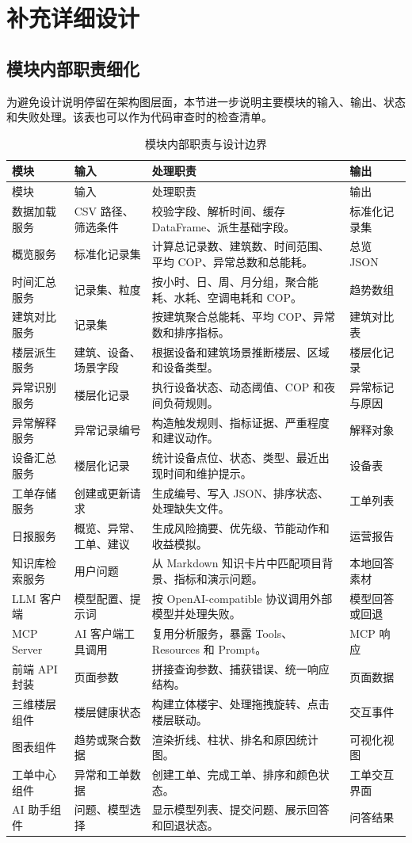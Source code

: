\documentclass[12pt,a4paper]{ctexart}
\begin{document}
\clearpage
\section{补充详细设计}
\subsection{模块内部职责细化}
为避免设计说明停留在架构图层面，本节进一步说明主要模块的输入、输出、状态和失败处理。该表也可以作为代码审查时的检查清单。
\begin{longtable}{L{3.4cm}L{3.8cm}L{4.8cm}L{3.1cm}}
\caption{模块内部职责与设计边界}\\
\toprule
模块 & 输入 & 处理职责 & 输出 \\
\midrule
\endfirsthead
\toprule
模块 & 输入 & 处理职责 & 输出 \\
\midrule
\endhead
数据加载服务 & CSV 路径、筛选条件 & 校验字段、解析时间、缓存 DataFrame、派生基础字段。 & 标准化记录集 \\
概览服务 & 标准化记录集 & 计算总记录数、建筑数、时间范围、平均 COP、异常总数和总能耗。 & 总览 JSON \\
时间汇总服务 & 记录集、粒度 & 按小时、日、周、月分组，聚合能耗、水耗、空调电耗和 COP。 & 趋势数组 \\
建筑对比服务 & 记录集 & 按建筑聚合总能耗、平均 COP、异常数和排序指标。 & 建筑对比表 \\
楼层派生服务 & 建筑、设备、场景字段 & 根据设备和建筑场景推断楼层、区域和设备类型。 & 楼层化记录 \\
异常识别服务 & 楼层化记录 & 执行设备状态、动态阈值、COP 和夜间负荷规则。 & 异常标记与原因 \\
异常解释服务 & 异常记录编号 & 构造触发规则、指标证据、严重程度和建议动作。 & 解释对象 \\
设备汇总服务 & 楼层化记录 & 统计设备点位、状态、类型、最近出现时间和维护提示。 & 设备表 \\
工单存储服务 & 创建或更新请求 & 生成编号、写入 JSON、排序状态、处理缺失文件。 & 工单列表 \\
日报服务 & 概览、异常、工单、建议 & 生成风险摘要、优先级、节能动作和收益模拟。 & 运营报告 \\
知识库检索服务 & 用户问题 & 从 Markdown 知识卡片中匹配项目背景、指标和演示问题。 & 本地回答素材 \\
LLM 客户端 & 模型配置、提示词 & 按 OpenAI-compatible 协议调用外部模型并处理失败。 & 模型回答或回退 \\
MCP Server & AI 客户端工具调用 & 复用分析服务，暴露 Tools、Resources 和 Prompt。 & MCP 响应 \\
前端 API 封装 & 页面参数 & 拼接查询参数、捕获错误、统一响应结构。 & 页面数据 \\
三维楼层组件 & 楼层健康状态 & 构建立体楼宇、处理拖拽旋转、点击楼层联动。 & 交互事件 \\
图表组件 & 趋势或聚合数据 & 渲染折线、柱状、排名和原因统计图。 & 可视化视图 \\
工单中心组件 & 异常和工单数据 & 创建工单、完成工单、排序和颜色状态。 & 工单交互界面 \\
AI 助手组件 & 问题、模型选择 & 显示模型列表、提交问题、展示回答和回退状态。 & 问答结果 \\
\bottomrule
\end{longtable}
\end{document}
